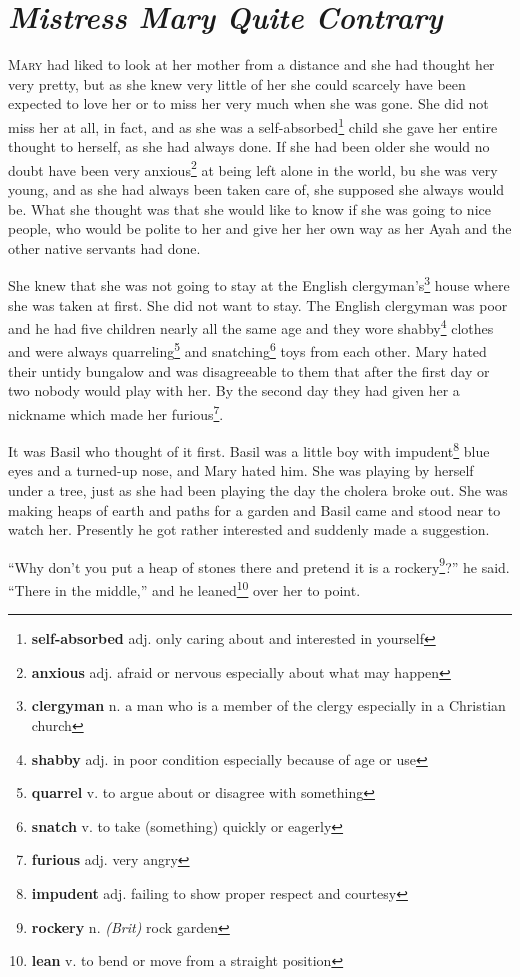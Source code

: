 \chapter{\textit{Mistress Mary Quite Contrary}}
\lettrine{M}{ary} had liked to look at her mother from a distance and she had thought her very pretty, but as she knew very little of her she could scarcely have been expected to love her or to miss her very much when she was gone. She did not miss her at all, in fact, and as she was a self-absorbed\footnote{\textbf{self-absorbed} adj. only caring about and interested in yourself} child she gave her entire thought to herself, as she had always done. If she had been older she would no doubt have been very anxious\footnote{\textbf{anxious} adj. afraid or nervous especially about what may happen} at being left alone in the world, bu she was very young, and as she had always been taken care of, she supposed she always would be. What she thought was that she would like to know if she was going to nice people, who would be polite to her and give her her own way as her Ayah and the other native servants had done.

She knew that she was not going to stay at the English clergyman's\footnote{\textbf{clergyman} n. a man who is a member of the clergy especially in a Christian church} house where she was taken at first. She did not want to stay. The English clergyman was poor and he had five children nearly all the same age and they wore shabby\footnote{\textbf{shabby} adj. in poor condition especially because of age or use} clothes and were always quarreling\footnote{\textbf{quarrel} v. to argue about or disagree with something} and snatching\footnote{\textbf{snatch} v. to take (something) quickly or eagerly} toys from each other. Mary hated their untidy bungalow and was disagreeable to them that after the first day or two nobody would play with her. By the second day they had given her a nickname which made her furious\footnote{\textbf{furious} adj. very angry}.

It was Basil who thought of it first. Basil was a little boy with impudent\footnote{\textbf{impudent} adj. failing to show proper respect and courtesy} blue eyes and a turned-up nose, and Mary hated him. She was playing by herself under a tree, just as she had been playing the day the cholera broke out. She was making heaps of earth and paths for a garden and Basil came and stood near to watch her. Presently he got rather interested and suddenly made a suggestion.

``Why don't you put a heap of stones there and pretend it is a rockery\footnote{\textbf{rockery} n. \textit{(Brit)} rock garden}?'' he said. ``There in the middle,'' and he leaned\footnote{\textbf{lean} v. to bend or move from a straight position} over her to point.

